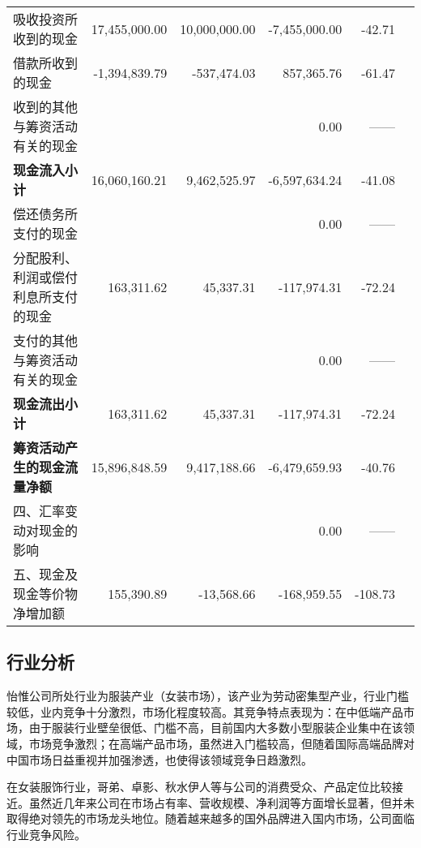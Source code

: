 \begin{longtable}{>{\scriptsize}l>{\scriptsize}r>{\scriptsize}r>{\scriptsize}r>{\scriptsize}r>{\scriptsize}r}
\hspace{2ex}	    吸收投资所收到的现金	&	17,455,000.00	&	10,000,000.00	&	-7,455,000.00	&	-42.71	\\
\hspace{2ex}	    借款所收到的现金	&	-1,394,839.79	&	-537,474.03	&	857,365.76	&	-61.47	\\
\hspace{2ex}	    收到的其他与筹资活动有关的现金	&		&		&	0.00	&	——	\\
\hspace{3ex}\bfseries 	现金流入小计	&	16,060,160.21	&	9,462,525.97	&	-6,597,634.24	&	-41.08	\\
\hspace{2ex}	    偿还债务所支付的现金	&		&		&	0.00	&	——	\\
\hspace{2ex}	    分配股利、利润或偿付利息所支付的现金	&	163,311.62	&	45,337.31	&	-117,974.31	&	-72.24	\\
\hspace{2ex}	    支付的其他与筹资活动有关的现金	&		&		&	0.00	&	——	\\
\hspace{3ex}\bfseries 	现金流出小计	&	163,311.62	&	45,337.31	&	-117,974.31	&	-72.24	\\
\hspace{3ex}\bfseries 	筹资活动产生的现金流量净额	&	15,896,848.59	&	9,417,188.66	&	-6,479,659.93	&	-40.76	\\
\midrule
	四、汇率变动对现金的影响	&		&		&	0.00	&	——	\\
	五、现金及现金等价物净增加额	&	155,390.89	&	-13,568.66	&	-168,959.55	&	-108.73	\\
\bottomrule
\end{longtable}\label{cash}
\hspace*{-1cm}

\subsection{行业分析}

怡惟公司所处行业为服装产业（女装市场），该产业为劳动密集型产业，行业门槛较低，业内竞争十分激烈，市场化程度较高。其竞争特点表现为：在中低端产品市场，由于服装行业壁垒很低、门槛不高，目前国内大多数小型服装企业集中在该领域，市场竞争激烈；在高端产品市场，虽然进入门槛较高，但随着国际高端品牌对中国市场日益重视并加强渗透，也使得该领域竞争日趋激烈。

在女装服饰行业，哥弟、卓影、秋水伊人等与公司的消费受众、产品定位比较接近。虽然近几年来公司在市场占有率、营收规模、净利润等方面增长显著，但并未取得绝对领先的市场龙头地位。随着越来越多的国外品牌进入国内市场，公司面临行业竞争风险。

